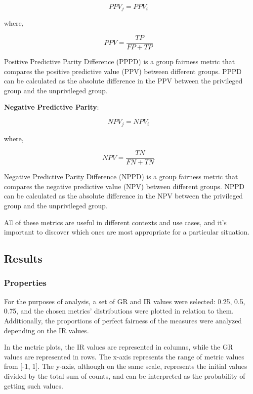 \documentclass[sn-vancouver]{sn-jnl}%
\theoremstyle{thmstyleone}%
\theoremstyle{thmstyletwo}%
\theoremstyle{thmstylethree}%
\begin{document}
\begin{equation}
PPV_{j} = PPV_{i} \label{eq9}
\end{equation}

where,

\begin{equation}
PPV = \frac{TP}{FP + TP} \label{eq10}
\end{equation}

Positive Predictive Parity Difference (PPPD) is a group fairness metric that compares the positive predictive value (PPV) between different groups. PPPD can be calculated as the absolute difference in the PPV between the privileged group and the unprivileged group.

\textbf{Negative Predictive Parity}:

\begin{equation}
NPV_{j} = NPV_{i} \label{eq11}
\end{equation}

where,

\begin{equation}
NPV = \frac{TN}{FN + TN} \label{eq12}
\end{equation}

Negative Predictive Parity Difference (NPPD) is a group fairness metric that compares the negative predictive value (NPV) between different groups. NPPD can be calculated as the absolute difference in the NPV between the privileged group and the unprivileged group.

All of these metrics are useful in different contexts and use cases, and it's important to discover which ones are most appropriate for a particular situation. 

\subsection{Results}\label{subsec4}

\subsubsection{Properties}\label{subsubsec1}

For the purposes of analysis, a set of GR and IR values were selected: {0.25, 0.5, 0.75}, and the chosen metrics' distributions were plotted in relation to them. Additionally, the proportions of perfect fairness of the measures were analyzed depending on the IR values.

In the metric plots, the IR values are represented in columns, while the GR values are represented in rows. The x-axis represents the range of metric values from [-1, 1]. The y-axis, although on the same scale, represents the initial values divided by the total sum of counts, and can be interpreted as the probability of getting such values.
\end{document}
